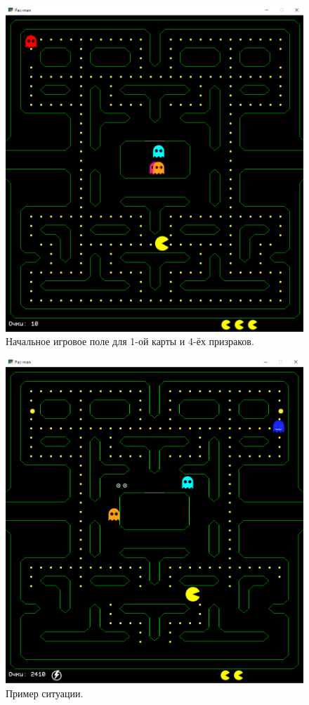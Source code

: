 \documentclass[14pt, oneside]{altsu-report}
\begin{document}
\begin{figure}[H]
	\centering
	\includegraphics[width=1\linewidth]{images/4.png}
	\caption{Начальное игровое поле для 1-ой карты и 4-ёх призраков.}
	\label{fig5}
\end{figure}

\begin{figure}[H]
	\centering
	\includegraphics[width=1\linewidth]{images/5.png}
	\caption{Пример ситуации.}
	\label{fig6}
\end{figure}
\end{document}
